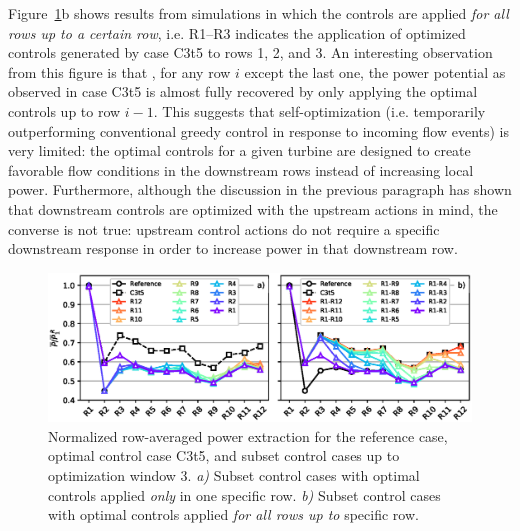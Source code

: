 \documentclass[wes, manuscript]{copernicus}
\newcommand{\revision}[1]{{\color{blue} #1}}
\begin{document}
Figure~\ref{fig:multirow}b shows results from simulations in which the controls are applied \emph{for all rows up to a certain row}, i.e. R1--R3 indicates the application of optimized controls generated by case C3t5 to rows 1, 2, and 3. An interesting observation from this figure is that , for any row $i$ except the last one, the power potential as observed in case C3t5 is almost fully recovered by only applying the optimal controls up to row $i-1$. This suggests that self-optimization \revision{(i.e. temporarily outperforming conventional greedy control in response to incoming flow events)} is very limited: the optimal controls for a given turbine are designed to create favorable flow conditions in the downstream rows instead of increasing local power. Furthermore, although the discussion in the previous paragraph has shown that downstream controls are optimized with the upstream actions in mind, the converse is not true: upstream control actions do not require a specific downstream response in order to increase power in that downstream row. 

\begin{figure}
	\includegraphics[width=\textwidth]{figure8}
	\caption{Normalized row-averaged power extraction for the reference case, optimal control case C3t5, and subset control cases up to optimization window 3. \emph{a)} Subset control cases with optimal controls applied \emph{only} in one specific row. \emph{b)} Subset control cases with optimal controls applied \emph{for all rows up to} specific row. \label{fig:multirow}}
\end{figure}
\end{document}
